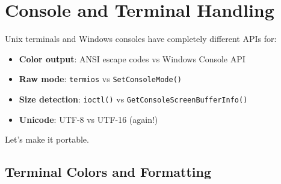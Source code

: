 \section{Console and Terminal Handling}

Unix terminals and Windows consoles have completely different APIs for:
\begin{itemize}
    \item \textbf{Color output}: ANSI escape codes vs Windows Console API
    \item \textbf{Raw mode}: \texttt{termios} vs \texttt{SetConsoleMode()}
    \item \textbf{Size detection}: \texttt{ioctl()} vs \texttt{GetConsoleScreenBufferInfo()}
    \item \textbf{Unicode}: UTF-8 vs UTF-16 (again!)
\end{itemize}

Let's make it portable.

\subsection{Terminal Colors and Formatting}

